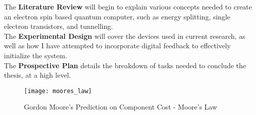 The \textbf{Literature Review} will begin to explain various concepts needed to create an electron spin based quantum computer, such as energy splitting, single electron transistors, and tunnelling. \\
The \textbf{Experimental Design} will cover the devices used in current research, as well as how I have attempted to incorporate digital feedback to effectively initialize the system. \\
The \textbf{Prospective Plan} details the breakdown of tasks needed to conclude the thesis, at a high level. \\

\begin{figure}[htbp!]
	\centering
	\texttt{[image: moores\_law]}
	\caption[Moore's Law]{Gordon Moore's Prediction on Component Cost - Moore's Law \cite{moore1965cramming}}
	\label{fig::moores_law}
\end{figure}
